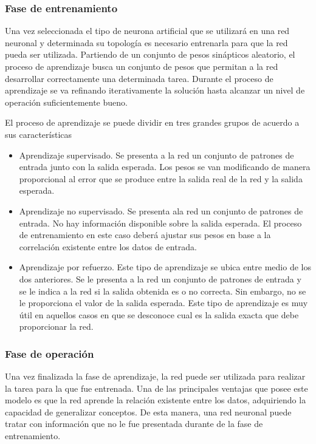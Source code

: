\subsubsection{Fase de entrenamiento}
Una vez seleccionada el tipo de neurona artificial que se utilizar\'a en una red
neuronal y determinada su topolog\'ia es necesario entrenarla para que la red
pueda ser utilizada. Partiendo de un conjunto de pesos sin\'apticos aleatorio, el
proceso de aprendizaje busca un conjunto de pesos que permitan a la red
desarrollar correctamente una determinada tarea. Durante el proceso de
aprendizaje se va refinando iterativamente la soluci\'on hasta alcanzar un nivel
de operaci\'on suficientemente bueno.

El proceso de aprendizaje se puede dividir en tres grandes grupos de
acuerdo a sus caracter\'isticas

\begin{itemize}
	\item Aprendizaje supervisado. Se presenta a la red un conjunto de
	patrones de entrada junto con la salida esperada. Los pesos se van
	modificando de manera proporcional al error que se produce entre la
	salida real de la red y la salida esperada.
	\item Aprendizaje no supervisado. Se presenta ala red un conjunto de
	patrones de entrada. No hay informaci\'on disponible sobre la salida
	esperada. El proceso de entrenamiento en este caso deber\'a ajustar
	sus pesos en base a la correlaci\'on existente entre los datos de
	entrada.
	\item Aprendizaje por refuerzo. Este tipo de aprendizaje se ubica entre
	medio de los dos anteriores. Se le presenta a la red un conjunto de
	patrones de entrada y se le indica a la red si la salida obtenida es o
	no correcta. Sin embargo, no se le proporciona el valor de la salida
	esperada. Este tipo de aprendizaje es muy \'util en aquellos casos en
	que se desconoce cual es la salida exacta que debe proporcionar la
	red. 
\end{itemize}

\subsubsection{Fase de operaci\'on}
Una vez finalizada la fase de aprendizaje, la red puede ser utilizada para
realizar la tarea para la que fue entrenada. Una de las principales ventajas que
posee este modelo es que la red aprende la relaci\'on existente entre los datos,
adquiriendo la capacidad de generalizar conceptos. De esta manera, una red
neuronal puede tratar con informaci\'on que no le fue presentada durante de la
fase de entrenamiento.

